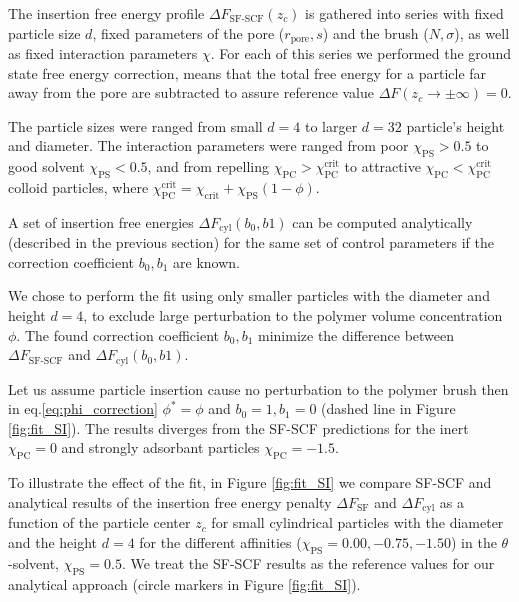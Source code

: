 \documentclass[10pt, a4paper]{article}
\begin{document}
\begin{multicols}{2}
The insertion free energy profile $\Delta F_{\textrm{SF-SCF}}(z_c)$ is gathered into series with fixed particle size $d$, fixed parameters of the pore ($r_{\textrm{pore}}, s$) and the brush ($N, \sigma$), as well as fixed interaction parameters $\chi$.
For each of this series we performed the ground state free energy correction, means that the total free energy for a particle far away from the pore are subtracted to assure reference value $\Delta F(z_c \to \pm \infty) = 0$.

The particle sizes were ranged from small $d=4$ to  larger $d=32$ particle's height and diameter.
The interaction parameters were ranged from poor $\chi_{\textrm{PS}} > 0.5$ to good solvent $\chi_{\textrm{PS}} < 0.5$, and from repelling  $\chi_{\textrm{PC}} > \chi_{\textrm{PC}}^{\textrm{crit}}$ to attractive $\chi_{\textrm{PC}} < \chi_{\textrm{PC}}^{\textrm{crit}}$ colloid particles, where $\chi_{\textrm{PC}}^{\textrm{crit}} = \chi_{\textrm{crit}} + \chi_{\textrm{PS}}(1-\phi)$.

A set of insertion free energies $\Delta F_{\textrm{cyl}}(b_0, b1)$ can be computed analytically (described in the previous section) for the same set of control parameters if the correction coefficient $b_0, b_1$ are known.

We chose to perform the fit using only smaller particles with the diameter and height $d=4$, to exclude large perturbation to the polymer volume concentration $\phi$. The found correction coefficient $b_0, b_1$ minimize the difference between $\Delta F_{\textrm{SF-SCF}}$ and $\Delta F_{\textrm{cyl}}(b_0, b1)$.

Let us assume particle insertion cause no perturbation to the polymer brush then in eq.\ref{eq:phi_correction} $\phi^{\ast} = \phi$ and $b_0 = 1, b_1 = 0$ (dashed line in Figure \ref{fig:fit_SI}).
The results diverges from the SF-SCF predictions for the inert $\chi_{\textrm{PC}} = 0$ and strongly adsorbant particles $\chi_{\textrm{PC}} = -1.5$.

To illustrate the effect of the fit, in Figure \ref{fig:fit_SI} we compare SF-SCF and analytical results of the insertion free energy penalty $\Delta F_{\textrm{SF}}$ and $\Delta F_{\textrm{cyl}}$ as a function of the particle center $z_c$ for small cylindrical particles with the diameter and the height $d=4$ for the different affinities ($\chi_{\textrm{PS}} = 0.00, -0.75, -1.50$) in the $\theta$-solvent, $\chi_{\textrm{PS}} = 0.5$.
We treat the SF-SCF results as the reference values for our analytical approach (circle markers in Figure \ref{fig:fit_SI}).


\end{multicols}
\end{document}
